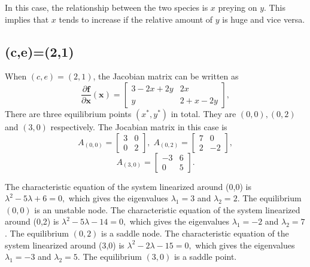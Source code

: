 \documentclass[a4paper,twocolumn]{article} %
\begin{document}
In this case, the relationship between the two species is $x$ preying on $y$. This implies that $x$ tends to increase if the relative amount of $y$ is huge and vice versa.   

\subsection{(c,e)=(2,1)} 
When $(c,e)=(2,1)$, the Jacobian matrix can be written as
\begin{equation*}
    \frac{\partial\textbf{f}}{\partial \textbf{x}}(\textbf{x}) =
    \left[\begin{array}{cc}
    3-2x+2y & 2x \\
    y & 2+x-2y
    \end{array}\right],
\end{equation*}
There are three equilibrium points $(x^*,y^*)$ in total. They are $(0,0),(0,2)$ and $(3,0)$ respectively. The Jocabian matrix in this case is
\begin{equation*}
    A_{(0,0)} =
    \left[\begin{array}{cc}
    3 & 0 \\
    0 & 2
    \end{array}\right], \; A_{(0,2)} =
    \left[\begin{array}{cc}
    7 & 0 \\
    2 & -2
    \end{array}\right],   
    \end{equation*}
    \begin{equation*}
    A_{(3,0)} =
    \left[\begin{array}{cc}
    -3 & 6 \\
    0 & 5
    \end{array}\right].
\end{equation*}

The characteristic equation of the system linearized around \mbox{(0,0)} is
$\lambda^2 -5 \lambda + 6 = 0,$ which gives the eigenvalues $\lambda_{1} = 3$ and $\lambda_{2} = 2$. The equilibrium $(0,0)$ is an unstable node. 
The characteristic equation of the system linearized around \mbox{(0,2)} is
$\lambda^2 -5 \lambda - 14 = 0,$ which gives the eigenvalues $\lambda_1 = -2$ and $\lambda_2 = 7$. The equilibrium $(0,2)$ is a saddle node. 
The characteristic equation of the system linearized around \mbox{(3,0)} is
$\lambda^2 -2 \lambda - 15 = 0,$ which gives the eigenvalues $\lambda_1 = -3$ and $\lambda_2 = 5$. The equilibrium $(3,0)$ is a saddle point.
\end{document}
